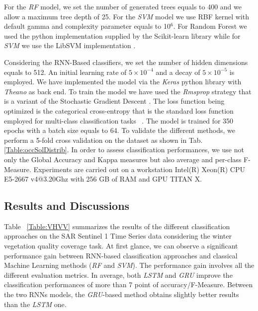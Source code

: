 \documentclass[journal, onecolumn]{IEEEtran}
\begin{document}
For the \textit{RF} model, we set the number of generated trees equals to 400 and we allow a maximum tree depth of 25. For the \textit{SVM} model we use RBF kernel with default gamma and complexity parameter equals to 10$^6$. For Random Forest we used the python implementation supplied by the Scikit-learn library  \cite{scikit-learn} while for \textit{SVM} we use the LibSVM implementation \cite{CC01a}. 

Considering the RNN-Based classifiers, we set the number of hidden dimensions equals to 512. An initial learning rate of $5 \times 10^{-4}$ and a decay of $5 \times 10^{-5}$ is employed. We have implemented the model via the \textit{Keras} python library  \cite{chollet2015} with \textit{Theano} as back end. 
To train the model we have used the \textit{Rmsprop} strategy that is a variant of the Stochastic Gradient Descent \cite{DauphinVCB15}. The loss function being optimized is the categorical cross-entropy that is the standard loss function employed for multi-class classification tasks ~\cite{Zhang16}. The model is trained for 350 epochs with a batch size equals to 64. To validate the different methods, we perform a 5-fold cross validation on the dataset as shown in Tab. \ref{Table:occSolDistrib}.  In order to assess classification performances, we use not only the Global Accuracy and Kappa measures but also average and per-class F-Measure. Experiments are carried out on a workstation Intel(R) Xeon(R) CPU E5-2667 v4@3.20Ghz with 256 GB of RAM and GPU TITAN X.



\subsection{Results and Discussions}
Table ~\ref{Table:VHVV} summarizes the results of the different classification approaches on the SAR Sentinel 1 Time Series data considering the winter vegetation quality coverage task. 
At first glance, we can observe a significant performance gain between RNN-based classification approaches and classical Machine Learning methods (\textit{RF} and \textit{SVM}). The performance gain involves all the different evaluation metrics. In average, both \textit{LSTM} and \textit{GRU} improve the classification performances of more than 7 point of accuracy/F-Measure. Between the two RNNs models, the \textit{GRU}-based method obtains slightly better results than the \textit{LSTM} one.
\end{document}

